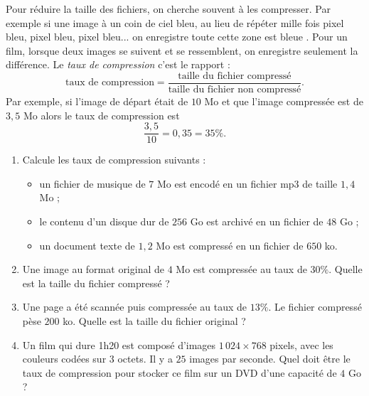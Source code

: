\documentclass[class=report,crop=false, 12pt]{standalone}
\begin{document}
\begin{activite}
Pour réduire la taille des fichiers, on cherche souvent à les compresser.
Par exemple si une image à un coin de ciel bleu, au lieu de répéter mille fois \og pixel bleu, pixel bleu, pixel bleu... \fg{} on enregistre \og toute cette zone est bleue \fg{}. 
Pour un film, lorsque deux images se suivent et se ressemblent, on enregistre seulement la différence.
Le \emph{taux de compression} c'est le rapport :
$$\text{taux de compression} = \frac{\text{taille du fichier compressé}}{\text{taille du fichier non compressé}}.$$
Par exemple, si l'image de départ était de $10$ Mo et que l'image compressée est de $3,5$ Mo alors le taux de compression est 
$$\frac{3,5}{10} = 0,35 = 35 \%.$$

\begin{enumerate}
  \item Calcule les taux de compression suivants :
  \begin{itemize} 
    \item un fichier de musique de $7$ Mo est encodé en un fichier mp3 de taille $1,4$ Mo ;
  
    \item le contenu d'un disque dur de $256$ Go est archivé en un fichier de $48$ Go ;
        
    \item un document texte de $1,2$ Mo est compressé en un fichier de $650$ ko.
  \end{itemize}
  
  \item Une image au format original de $4$ Mo est compressée au taux de $30 \%$. Quelle est la taille du fichier compressé ?
  
  \item Une page a été scannée puis compressée au taux de $13 \%$. Le fichier compressé pèse $200$ ko. Quelle est la taille du fichier original ?
  
  \item  Un film qui dure 1h20 est composé d'images $1\,024 \times 768$ pixels, avec les couleurs codées sur $3$ octets. Il y a $25$ images par seconde. Quel doit être le taux de compression pour stocker ce film sur un DVD d'une capacité de $4$ Go ?
\end{enumerate}
\end{activite}
\end{document}
